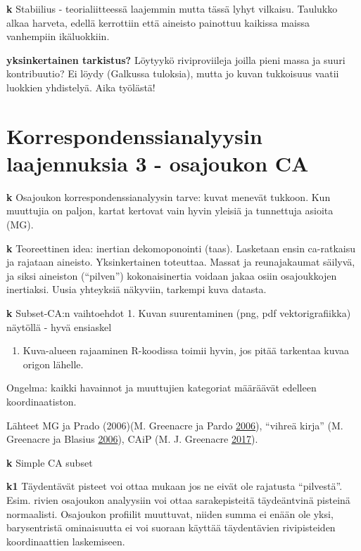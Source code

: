 \documentclass[
  finnish,
]{book}
\providecommand{\tightlist}{%
  \setlength{\itemsep}{0pt}\setlength{\parskip}{0pt}}
\begin{document}
\textbf{k} Stabiilius - teorialiitteessä laajemmin mutta tässä lyhyt
vilkaisu. Taulukko alkaa harveta, edellä kerrottiin että aineisto
painottuu kaikissa maissa vanhempiin ikäluokkiin.

\textbf{yksinkertainen tarkistus?} Löytyykö riviproviileja joilla pieni
massa ja suuri kontribuutio? Ei löydy (Galkussa tuloksia), mutta jo
kuvan tukkoisuus vaatii luokkien yhdistelyä. Aika työlästä!

\hypertarget{korrespondenssianalyysin-laajennuksia-3---osajoukon-ca}{%
\chapter{Korrespondenssianalyysin laajennuksia 3 - osajoukon
CA}\label{korrespondenssianalyysin-laajennuksia-3---osajoukon-ca}}

\textbf{k} Osajoukon korrespondenssianalyysin tarve: kuvat menevät
tukkoon. Kun muuttujia on paljon, kartat kertovat vain hyvin yleisiä ja
tunnettuja asioita (MG).

\textbf{k} Teoreettinen idea: inertian dekomoponointi (taas). Lasketaan
ensin ca-ratkaisu ja rajataan aineisto. Yksinkertainen toteuttaa. Massat
ja reunajakaumat säilyvä, ja siksi aineiston (``pilven'')
kokonaisinertia voidaan jakaa osiin osajoukkojen inertiaksi. Uusia
yhteyksiä näkyviin, tarkempi kuva datasta.

\textbf{k} Subset-CA:n vaihtoehdot 1. Kuvan suurentaminen (png, pdf
vektorigrafiikka) näytöllä - hyvä ensiaskel

\begin{enumerate}
\def\labelenumi{\arabic{enumi}.}
\setcounter{enumi}{1}
\tightlist
\item
  Kuva-alueen rajaaminen R-koodissa toimii hyvin, jos pitää tarkentaa
  kuvaa origon lähelle.
\end{enumerate}

Ongelma: kaikki havainnot ja muuttujien kategoriat määräävät edelleen
koordinaatiston.

Lähteet MG ja Prado (2006)(M. Greenacre ja Pardo
\protect\hyperlink{ref-RefWorks:doc:5a857a44e4b0ed2d44664d87}{2006}),
``vihreä kirja'' (M. Greenacre ja Blasius
\protect\hyperlink{ref-RefWorks:doc:5ab76b43e4b003f4468d1f07}{2006}),
CAiP (M. J. Greenacre
\protect\hyperlink{ref-RefWorks:doc:5a857a43e4b0ed2d44664d78}{2017}).

\textbf{k} Simple CA subset

\textbf{k1} Täydentävät pisteet voi ottaa mukaan jos ne eivät ole
rajatusta ``pilvestä''. Esim. rivien osajoukon analyysiin voi ottaa
sarakepisteitä täydeäntvinä pisteinä normaalisti. Osajoukon profiilit
muuttuvat, niiden summa ei enään ole yksi, barysentristä ominaisuutta ei
voi suoraan käyttää täydentävien rivipisteiden koordinaattien
laskemiseen.
\end{document}
